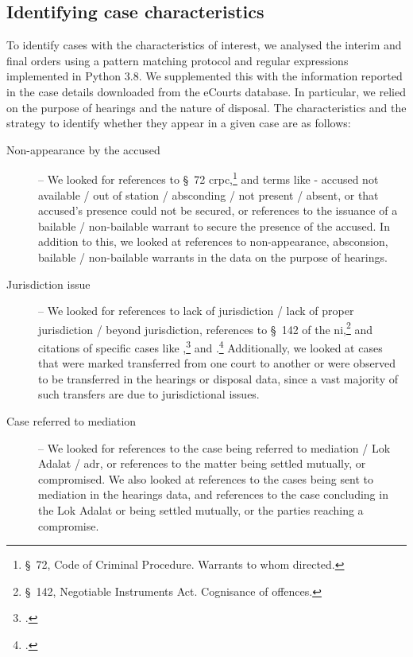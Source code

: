 \documentclass[12pt,a4paper]{article}
\begin{document}
\subsection{Identifying case characteristics} \label{sec:text-mining}

To identify cases with the characteristics of interest, we analysed the interim and final orders using a pattern matching protocol and regular expressions implemented in Python 3.8. We supplemented this with the information reported in the case details downloaded from the eCourts database. In particular, we relied on the purpose of hearings and the nature of disposal. The characteristics and the strategy to identify whether they appear in a given case are as follows:

\begin{description}
\item [Non-appearance by the accused] -- We looked for references to \S~72 \gls{crpc},\footnote{\S~72, Code of Criminal Procedure. Warrants to whom directed.} and terms like - accused not available / out of station / absconding / not present / absent, or that accused’s presence could not be secured, or references to the issuance of a bailable / non-bailable warrant to secure the presence of the accused. In addition to this, we looked at references to non-appearance, absconsion, bailable / non-bailable warrants in the data on the purpose of hearings.

\item[]

\item [Jurisdiction issue] -- We looked for references to lack of jurisdiction / lack of proper jurisdiction / beyond jurisdiction, references to \S~142 of the \gls{ni},\footnote{\S~142, Negotiable Instruments Act. Cognisance of offences.} and citations of specific cases like ,\footcite{sc2014_dhanuka} and .\footcite{sc2016_carbon} Additionally, we looked at cases that were marked transferred from one court to another or were observed to be transferred in the hearings or disposal data, since a vast majority of such transfers are due to jurisdictional issues.

\item[]

\item [Case referred to mediation] -- We looked for references to the case being referred to mediation / Lok Adalat / \gls{adr}, or references to the matter being settled mutually, or compromised. We also looked at references to the cases being sent to mediation in the hearings data, and references to the case concluding in the Lok Adalat or being settled mutually, or the parties reaching a compromise.


\end{description}
\end{document}
